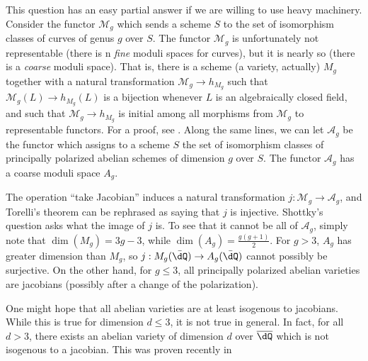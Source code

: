 \documentclass{article}
\begin{document}
This question has an easy partial answer if we are willing to use heavy 
machinery. Consider the functor $\mathcal{M}_g$ which sends a scheme $S$ to the 
set of isomorphism classes of curves of genus $g$ over $S$. The functor 
$\mathcal{M}_g$ is unfortunately not representable (there is n 
\emph{fine} moduli spaces for curves), but it is nearly so (there is a 
\emph{coarse} moduli space). That is, there is a scheme (a variety, 
actually) $M_g$ together with a natural transformation 
$\mathcal{M}_g\to h_{M_g}$ such that $\mathcal{M}_g(L)\to h_{M_g}(L)$ is a 
bijection whenever $L$ is an algebraically closed field, and such that 
$\mathcal{M}_g\to h_{M_g}$ is initial among all morphisms from $\mathcal{M}_g$ 
to representable functors. For a proof, see \cite[5]{mu94}. Along the same lines, 
we can let $\mathcal{A}_g$ be the functor which assigns to a scheme $S$ the set 
of isomorphism classes of principally polarized abelian schemes of dimension 
$g$ over $S$. The functor $\mathcal{A}_g$ has a coarse moduli space $A_g$. 

The operation ``take Jacobian'' induces a natural transformation 
$j:\mathcal{M}_g\to\mathcal{A}_g$, and Torelli's theorem can be rephrased as 
saying that $j$ is injective. Shottky's question asks what the image of $j$ is. 
To see that it cannot be all of $\mathcal{A}_g$, simply note that 
$\dim(M_g) = 3 g - 3$, while $\dim(A_g) = \frac{g(g+1)}{2}$. For 
$g>3$, $A_g$ has greater dimension than $M_g$, so 
$j:M_g(\bar\dQ)\to A_g(\bar\dQ)$ cannot possibly be surjective. On the other 
hand, for $g\leqslant 3$, all principally polarized abelian varieties are 
jacobians (possibly after a change of the polarization). 

One might hope that all abelian varieties are at least isogenous to jacobians. 
While this is true for dimension $d\leqslant 3$, it is not true in general. 
In fact, for all $d>3$, there exists an abelian variety of dimension $d$ over 
$\overline{\dQ}$ which is not isogenous to a jacobian. This was proven 
recently in \cite{ts12}
\end{document}
